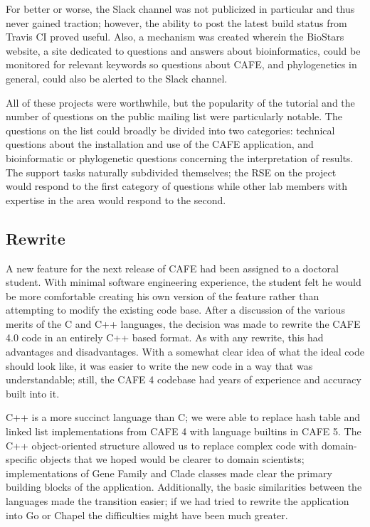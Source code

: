 \documentclass[acmtog, authorversion]{acmart}
\begin{document}
    For better or worse, the Slack channel was not publicized in particular and thus never gained traction; however, the ability to post the latest build status from Travis CI proved useful. Also, a mechanism was created wherein the BioStars website, a site dedicated to questions and answers about bioinformatics, could be monitored for relevant keywords so questions about CAFE, and phylogenetics in general, could also be alerted to the Slack channel. 
    
    All of these projects were worthwhile, but the popularity of the tutorial and the number of questions on the public mailing list were particularly notable. The questions on the list could broadly be divided into two categories: technical questions about the installation and use of the CAFE application, and bioinformatic or phylogenetic questions concerning the interpretation of results. The support tasks naturally subdivided themselves; the RSE on the project would respond to the first category of questions while other lab members with expertise in the area would respond to the second.

\subsection{Rewrite}
    A new feature for the next release of CAFE had been assigned to a doctoral student. With minimal software engineering experience, the student felt he would be more comfortable creating his own version of the feature rather than attempting to modify the existing code base. After a discussion of the various merits of the C and C++ languages, the decision was made to rewrite the CAFE 4.0 code in an entirely C++ based format. As with any rewrite, this had advantages and disadvantages. With a somewhat clear idea of what the ideal code should look like, it was easier to write the new code in a way that was understandable; still, the CAFE 4 codebase had years of experience and accuracy built into it. 
    
    C++ is a more succinct language than C; we were able to replace hash table and linked list implementations from CAFE 4 with language builtins in CAFE 5. The C++ object-oriented structure allowed us to replace complex code with domain-specific objects that we hoped would be clearer to domain scientists; implementations of Gene Family and Clade classes made clear the primary building blocks of the application. Additionally, the basic similarities between the languages made the transition easier; if we had tried to rewrite the application into Go or Chapel the difficulties might have been much greater.
    
\end{document}
